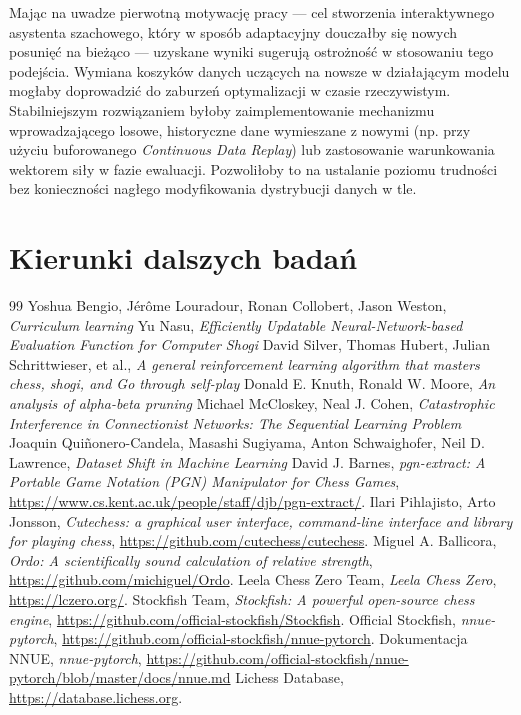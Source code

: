 \documentclass[12pt,a4paper]{report}
\begin{document}
Mając na uwadze pierwotną motywację pracy — cel stworzenia interaktywnego asystenta szachowego, który w sposób adaptacyjny douczałby się nowych posunięć na bieżąco — uzyskane wyniki sugerują ostrożność w stosowaniu tego podejścia. Wymiana koszyków danych uczących na nowsze w działającym modelu mogłaby doprowadzić do zaburzeń optymalizacji w czasie rzeczywistym. Stabilniejszym rozwiązaniem byłoby zaimplementowanie mechanizmu wprowadzającego losowe, historyczne dane wymieszane z nowymi (np. przy użyciu buforowanego \textit{Continuous Data Replay}) lub zastosowanie warunkowania wektorem siły w fazie ewaluacji. Pozwoliłoby to na ustalanie poziomu trudności bez konieczności nagłego modyfikowania dystrybucji danych w tle.

\section{Kierunki dalszych badań}

\begin{thebibliography}{99}
     Yoshua Bengio, Jérôme Louradour, Ronan Collobert, Jason Weston, \textit{Curriculum learning}
     Yu Nasu, \textit{Efficiently Updatable Neural-Network-based Evaluation Function for Computer Shogi}
     David Silver, Thomas Hubert, Julian Schrittwieser, et al., \textit{A general reinforcement learning algorithm that masters chess, shogi, and Go through self-play}
     Donald E. Knuth, Ronald W. Moore, \textit{An analysis of alpha-beta pruning}
     Michael McCloskey, Neal J. Cohen, \textit{Catastrophic Interference in Connectionist Networks: The Sequential Learning Problem}
     Joaquin Quiñonero-Candela, Masashi Sugiyama, Anton Schwaighofer, Neil D. Lawrence, \textit{Dataset Shift in Machine Learning}
     David J. Barnes, \textit{pgn-extract: A Portable Game Notation (PGN) Manipulator for Chess Games}, \url{https://www.cs.kent.ac.uk/people/staff/djb/pgn-extract/}.
     Ilari Pihlajisto, Arto Jonsson, \textit{Cutechess: a graphical user interface, command-line interface and library for playing chess}, \url{https://github.com/cutechess/cutechess}.
     Miguel A. Ballicora, \textit{Ordo: A scientifically sound calculation of relative strength}, \url{https://github.com/michiguel/Ordo}.
     Leela Chess Zero Team, \textit{Leela Chess Zero}, \url{https://lczero.org/}.
     Stockfish Team, \textit{Stockfish: A powerful open-source chess engine}, \url{https://github.com/official-stockfish/Stockfish}.
     Official Stockfish, \textit{nnue-pytorch}, \url{https://github.com/official-stockfish/nnue-pytorch}.
     Dokumentacja NNUE, \textit{nnue-pytorch}, \url{https://github.com/official-stockfish/nnue-pytorch/blob/master/docs/nnue.md}
     Lichess Database, \url{https://database.lichess.org}.
\end{thebibliography}

\listoffigures
\end{document}
